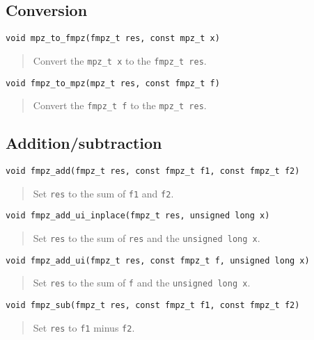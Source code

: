 \documentclass[a4paper,10pt]{article}
\newcommand{\code}{\lstinline}
\begin{document}
\subsection{Conversion}

\begin{lstlisting}
void mpz_to_fmpz(fmpz_t res, const mpz_t x)
\end{lstlisting}
\begin{quote}
Convert the \code{mpz_t x} to the \code{fmpz_t res}. 
\end{quote}

\begin{lstlisting}
void fmpz_to_mpz(mpz_t res, const fmpz_t f)
\end{lstlisting}
\begin{quote}
Convert the \code{fmpz_t f} to the \code{mpz_t res}. 
\end{quote}

\subsection{Addition/subtraction}

\begin{lstlisting}
void fmpz_add(fmpz_t res, const fmpz_t f1, const fmpz_t f2)
\end{lstlisting}
\begin{quote}
Set \code{res} to the sum of \code{f1} and \code{f2}.
\end{quote}

\begin{lstlisting}
void fmpz_add_ui_inplace(fmpz_t res, unsigned long x)
\end{lstlisting}
\begin{quote}
Set \code{res} to the sum of \code{res} and the \code{unsigned long x}.
\end{quote}

\begin{lstlisting}
void fmpz_add_ui(fmpz_t res, const fmpz_t f, unsigned long x)
\end{lstlisting}
\begin{quote}
Set \code{res} to the sum of \code{f} and the \code{unsigned long x}.
\end{quote}

\begin{lstlisting}
void fmpz_sub(fmpz_t res, const fmpz_t f1, const fmpz_t f2)
\end{lstlisting}
\begin{quote}
Set \code{res} to \code{f1} minus \code{f2}.
\end{quote}
\end{document}
